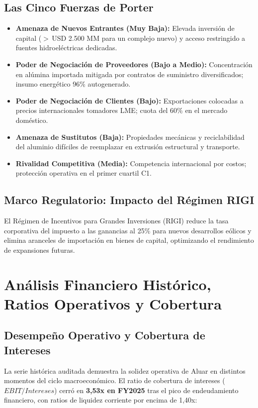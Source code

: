 \documentclass[10pt,a4paper]{article}
\begin{document}
\subsection{Las Cinco Fuerzas de Porter}
\begin{itemize}
    \item \textbf{Amenaza de Nuevos Entrantes (Muy Baja):} Elevada inversión de capital ($>$\,USD 2.500 MM para un complejo nuevo) y acceso restringido a fuentes hidroeléctricas dedicadas.
    \item \textbf{Poder de Negociación de Proveedores (Bajo a Medio):} Concentración en alúmina importada mitigada por contratos de suministro diversificados; insumo energético 96\% autogenerado.
    \item \textbf{Poder de Negociación de Clientes (Bajo):} Exportaciones colocadas a precios internacionales tomadores LME; cuota del 60\% en el mercado doméstico.
    \item \textbf{Amenaza de Sustitutos (Baja):} Propiedades mecánicas y reciclabilidad del aluminio difíciles de reemplazar en extrusión estructural y transporte.
    \item \textbf{Rivalidad Competitiva (Media):} Competencia internacional por costos; protección operativa en el primer cuartil C1.
\end{itemize}

\subsection{Marco Regulatorio: Impacto del Régimen RIGI}
El Régimen de Incentivos para Grandes Inversiones (RIGI) reduce la tasa corporativa del impuesto a las ganancias al 25\% para nuevos desarrollos eólicos y elimina aranceles de importación en bienes de capital, optimizando el rendimiento de expansiones futuras.

\section{Análisis Financiero Histórico, Ratios Operativos y Cobertura}

\subsection{Desempeño Operativo y Cobertura de Intereses}
La serie histórica auditada demuestra la solidez operativa de Aluar en distintos momentos del ciclo macroeconómico. El ratio de cobertura de intereses ($EBIT/Intereses$) cerró en \textbf{3,53x en FY2025} tras el pico de endeudamiento financiero, con ratios de liquidez corriente por encima de 1,40x:
\end{document}
